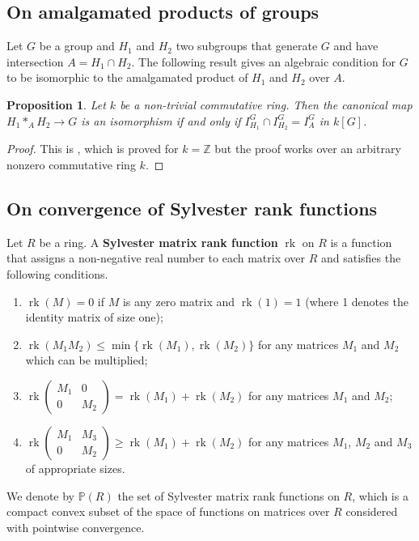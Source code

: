\documentclass[11pt]{amsart}
\newtheorem{pro}[lem]{Proposition}
\numberwithin{claimcounter}{lem}
\DeclareMathOperator{\rk}{rk}
\newcommand{\Z}{\mathbb{Z}}
\begin{document}
\subsection{On amalgamated products of groups}

Let  $G$ be a group and $H_1$ and $H_2$  two subgroups that generate $G$ and have intersection $A=H_1\cap H_2$.  The following result gives an algebraic condition for $G$ to be isomorphic to the amalgamated product of $H_1$ and $H_2$ over $A$.

\begin{pro}\label{critamal} \cite{Le70}  Let $k$ be a non-trivial commutative ring. Then the canonical map $H_1*_AH_2\to G$ is an isomorphism if and only if $I_{H_1}^G\cap I_{H_2}^G=I_A^G$ in $k[G]$.

\end{pro}

\begin{proof} This is  \cite[Theorem 1]{Le70}, which is proved for $k=\Z$ but the proof works over an arbitrary nonzero commutative ring $k$.
\end{proof}

\subsection{On convergence of Sylvester  rank functions}
 Let $R$  be a ring. A {\bf Sylvester matrix rank function} $\rk$ on $R$ is a function that assigns a non-negative real number to each matrix over $R$ and satisfies the following conditions.
 \begin{enumerate}
\item [(SMat1)] $\rk(M)=0$ if $M$ is any zero matrix and $\rk(1)=1$ (where 1 denotes the identity matrix of size one);
\item [(SMat2)]  $\rk(M_1M_2) \le \min\{\rk(M_1), \rk(M_2)\}$ for any matrices $M_1$ and $M_2$ which can be multiplied;
\item[(SMat3)] $\rk\left (\begin{array}{cc} M_1 & 0\\ 0 & M_2\end{array}\right ) = \rk(M_1) + \rk(M_2)$ for any matrices $M_1$ and $M_2$;
\item[(SMat4)] $\rk \left (\begin{array}{cc} M_1 & M_3\\ 0 & M_2\end{array}\right ) \ge \rk(M_1) + \rk(M_2)$ for any matrices $M_1$, $M_2$ and $M_3$ of appropriate sizes.
\end{enumerate}
We denote by $\mathbb{P}(R)$ the set of Sylvester matrix rank functions on $R$, which is a compact convex subset of the space of functions on matrices over $R$ considered with pointwise convergence.  
\end{document}
